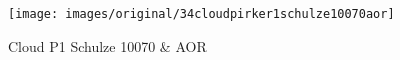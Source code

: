 \begin{figure}[!h] 
\centering 
\texttt{[image: images/original/34cloudpirker1schulze10070aor]}
\caption{Cloud P1 Schulze 10070 & AOR}
\label{fig:34cloudpirker1schulze10070aor} 
\end{figure}

